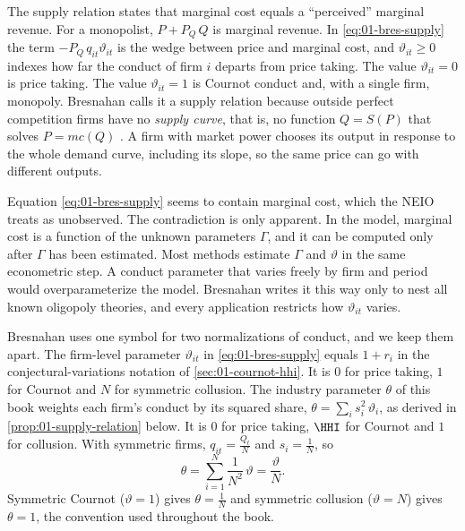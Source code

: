 The supply relation states that marginal cost equals a ``perceived'' marginal revenue. For a monopolist,
$P + P_Q\,Q$ is marginal revenue. In \eqref{eq:01-bres-supply} the term $-P_Q\,q_{it}\vartheta_{it}$ is the wedge
between price and marginal cost, and $\vartheta_{it} \ge 0$ indexes how far the conduct of firm $i$ departs from price
taking. The value $\vartheta_{it} = 0$ is price taking. The value $\vartheta_{it} = 1$ is Cournot conduct and, with a
single firm, monopoly. Bresnahan calls it a supply relation because outside perfect competition firms have no
\emph{supply curve}, that is, no function $Q = S(P)$ that solves $P = mc(Q)$ \citep[fn.~6]{Bresnahan1989}. A firm
with market power chooses its output in response to the whole demand curve, including its slope, so the same price
can go with different outputs.

Equation \eqref{eq:01-bres-supply} seems to contain marginal cost, which the NEIO treats as unobserved. The
contradiction is only apparent. In the model, marginal cost is a function of the unknown parameters $\Gamma$, and it
can be computed only after $\Gamma$ has been estimated. Most methods estimate $\Gamma$ and $\vartheta$ in the same econometric step. A conduct parameter
that varies freely by firm and period would overparameterize the model. Bresnahan writes it this way only to nest all
known oligopoly theories, and every application restricts how $\vartheta_{it}$ varies.

\begin{remark}\label{rem:01-firm-industry-conduct}
Bresnahan uses one symbol for two normalizations of conduct, and we keep them apart. The firm-level parameter
$\vartheta_{it}$ in \eqref{eq:01-bres-supply} equals $1 + r_i$ in the conjectural-variations notation of
\cref{sec:01-cournot-hhi}. It is $0$ for price taking, $1$ for Cournot and $N$ for symmetric collusion. The industry
parameter $\theta$ of this book weights each firm's conduct by its squared share, $\theta = \sum_i s_i^2\,\vartheta_i$,
as derived in \cref{prop:01-supply-relation} below. It is $0$ for price taking, $\HHI$ for Cournot and $1$ for collusion. With
symmetric firms, $q_{it} = \frac{Q_t}{N}$ and $s_i = \frac{1}{N}$, so
\begin{equation*}
\theta = \sum_{i=1}^{N} \frac{1}{N^2}\,\vartheta = \frac{\vartheta}{N}.
\end{equation*}
Symmetric Cournot ($\vartheta = 1$) gives $\theta = \frac{1}{N}$ and symmetric collusion ($\vartheta = N$) gives
$\theta = 1$, the convention used throughout the book.
\end{remark}

